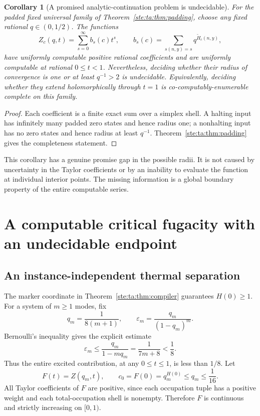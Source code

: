 \documentclass[11pt,letterpaper]{article}
\newtheorem{corollary}[theorem]{Corollary}
\theoremstyle{definition}
\theoremstyle{remark}
\newcommand{\epsm}{\varepsilon_m}
\begin{document}
\begin{corollary}[A promised analytic-continuation problem is undecidable]\label{ste:ta:cor:radius}
For the padded fixed universal family of Theorem~\ref{ste:ta:thm:padding}, choose any fixed rational $q\in(0,1/2)$. The functions
\[
Z_c(q,t)=\sum_{s=0}^\infty b_s(c)t^s,
\qquad
b_s(c)=\sum_{s(n,y)=s}q^{\widetilde H_c(n,y)},
\]
have uniformly computable positive rational coefficients and are uniformly computable at rational $0\le t<1$. Nevertheless, deciding whether their radius of convergence is one or at least $q^{-1}>2$ is undecidable. Equivalently, deciding whether they extend holomorphically through $t=1$ is co-computably-enumerable complete on this family.
\end{corollary}
\begin{proof}
Each coefficient is a finite exact sum over a simplex shell. A halting input has infinitely many padded zero states and hence radius one; a nonhalting input has no zero states and hence radius at least $q^{-1}$. Theorem~\ref{ste:ta:thm:padding} gives the completeness statement.
\end{proof}

This corollary has a genuine promise gap in the possible radii. It is not caused by uncertainty in the Taylor coefficients or by an inability to evaluate the function at individual interior points. The missing information is a global boundary property of the entire computable series.

\section{A computable critical fugacity with an undecidable endpoint}
\subsection{An instance-independent thermal separation}
The marker coordinate in Theorem~\ref{ste:ta:thm:compiler} guarantees $H(0)\ge1$. For a system of $m\ge1$ modes, fix
\begin{equation}\label{ste:ta:eq:qchoice}
q_m=\frac{1}{8(m+1)},\qquad
\epsm=\frac{q_m}{(1-q_m)^m}.
\end{equation}
Bernoulli's inequality gives the explicit estimate
\begin{equation}\label{ste:ta:eq:epsbound}
\epsm\le\frac{q_m}{1-mq_m}
=\frac1{7m+8}<\frac18.
\end{equation}
Thus the entire excited contribution, at any $0\le t\le1$, is less than $1/8$. Let
\[
F(t)=Z(q_m,t),\qquad c_0=F(0)=q_m^{H(0)}\le q_m\le\frac1{16}.
\]
All Taylor coefficients of $F$ are positive, since each occupation tuple has a positive weight and each total-occupation shell is nonempty. Therefore $F$ is continuous and strictly increasing on $[0,1)$.
\end{document}
